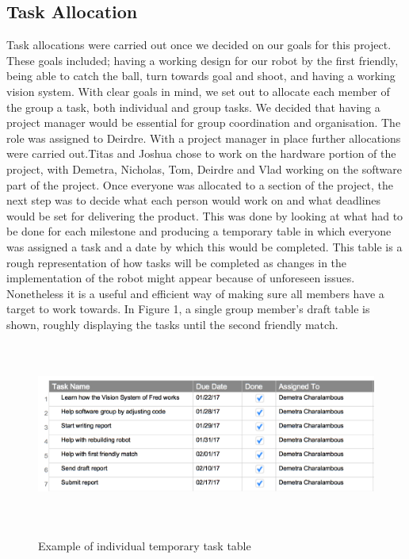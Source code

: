 \documentclass{article}
\begin{document}
\subsection{Task Allocation}
Task allocations were carried out once we decided on our goals for this project.
These goals included; having a working design for our robot by the first
friendly, being able to catch the ball, turn towards goal and shoot, and having
a working vision system. With clear goals in mind, we set out to allocate each
member of the group a task, both individual and group tasks. We decided that
having a project manager would be essential for group coordination and
organisation. The role was assigned to Deirdre. With a project manager in place
further allocations were carried out.Titas and Joshua chose to work on the
hardware portion of the project, with Demetra, Nicholas, Tom, Deirdre and Vlad
working on the software part of the project. Once everyone was allocated to a
section of the project, the next step was to decide what each person would work
on and what deadlines would be set for delivering the product. This was done by
looking at what had to be done for each milestone and producing a temporary
table in which everyone was assigned a task and a date by which this would be
completed. This table is a rough representation of how tasks will be completed
as changes in the implementation of the robot might appear because of unforeseen
issues. Nonetheless it is a useful and efficient way of making sure all members
have a target to work towards. In Figure 1, a single group member's draft table
is shown, roughly displaying the tasks until the second friendly match.

\begin{figure}[H]
	\centering
	\begin{minipage}{1\textwidth}
		\centering
		\includegraphics[width=16cm, height=6cm]{task_D.png}\\
		\caption{Example of individual temporary task table}
	\end{minipage}%
\end{figure}
\end{document}
